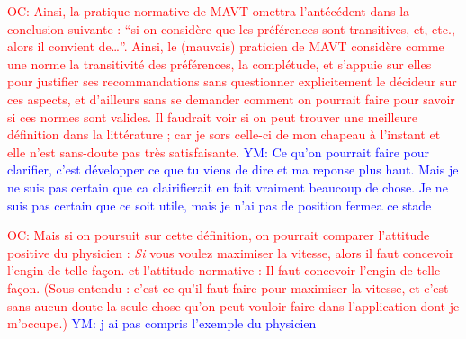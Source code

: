 \documentclass[preprint, french, english, 11pt]{elsarticle}%
\newcommand{\commentYM}[1]{\textcolor{blue}{YM: #1}}
\newcommand{\commentOC}[1]{\textcolor{red}{OC: #1}}
\begin{document}
\commentOC{Ainsi, la pratique normative de MAVT omettra l’antécédent dans la conclusion suivante : “si on considère que les préférences sont transitives, et, etc., alors il convient de…”. Ainsi, le (mauvais) praticien de MAVT considère comme une norme la transitivité des préférences, la complétude, et s’appuie sur elles pour justifier ses recommandations sans questionner explicitement le décideur sur ces aspects, et d’ailleurs sans se demander comment on pourrait faire pour savoir si ces normes sont valides. Il faudrait voir si on peut trouver une meilleure définition dans la littérature ; car je sors celle-ci de mon chapeau à l’instant et elle n’est sans-doute pas très satisfaisante.}
\commentYM{Ce qu'on pourrait faire pour clarifier, c'est développer ce que tu viens de dire et ma reponse plus haut. Mais je ne suis pas certain que ca clairifierait en fait vraiment beaucoup de chose. Je ne suis pas certain que ce soit utile, mais je n'ai pas de position fermea ce stade}


\commentOC{ Mais si on poursuit sur cette définition, on pourrait comparer l’attitude positive du physicien : \og{}\emph{Si} vous voulez maximiser la vitesse, alors il faut concevoir l’engin de telle façon.\fg{} et l’attitude normative : \og{}Il faut concevoir l’engin de telle façon.\fg{} (Sous-entendu : c’est ce qu’il faut faire pour maximiser la vitesse, et c’est sans aucun doute la seule chose qu’on peut vouloir faire dans l’application dont je m’occupe.)}
\commentYM{j ai pas compris l'exemple du physicien}
\end{document}
